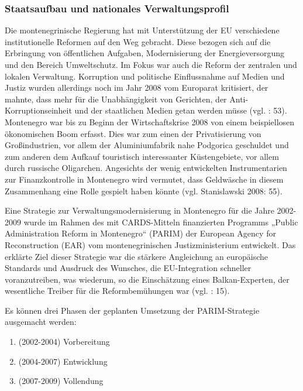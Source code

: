 \subsubsection{Staatsaufbau und nationales Verwaltungsprofil}

Die montenegrinische Regierung hat mit Unterstützung der EU verschiedene institutionelle Reformen auf den Weg gebracht. Diese bezogen sich auf die Erbringung von öffentlichen Aufgaben, Modernisierung der Energieversorgung und den Bereich Umweltschutz. Im Fokus war auch die Reform der zentralen und lokalen Verwaltung. Korruption und politische Einflussnahme auf Medien und Justiz wurden allerdings noch im Jahr 2008 vom Europarat kritisiert, der mahnte, dass mehr für die Unabhängigkeit von Gerichten, der Anti-Korruptionseinheit und der staatlichen Medien getan werden müsse (vgl. \cite{stanislaw} : 53). Montenegro war bis zu Beginn der Wirtschaftskrise 2008 von einem beispiellosen ökonomischen Boom erfasst. Dies war zum einen der Privatisierung von Großindustrien, vor allem der Aluminiumfabrik nahe Podgorica geschuldet und zum anderen dem Aufkauf touristisch interessanter Küstengebiete, vor allem durch russische Oligarchen. Angesichts der wenig entwickelten Instrumentarien zur Finanzkontrolle in Montenegro wird vermutet, dass Geldwäsche in diesem Zusammenhang eine Rolle gespielt haben könnte (vgl. Stanislawski 2008: 55).\par
Eine Strategie zur Verwaltungsmodernisierung in Montenegro für die Jahre 2002-2009 wurde im Rahmen des mit CARDS-Mitteln finanzierten Programms „Public Administration Reform in Montenegro“ (PARIM) der European Agency for Reconstruction (EAR) vom montenegrinischen Justizministerium entwickelt. Das erklärte Ziel dieser Strategie war die stärkere Angleichung an europäische Standards und Ausdruck des Wunsches, die EU-Integration schneller voranzutreiben, was wiederum, so die Einschätzung eines Balkan-Experten, der wesentliche Treiber für die Reformbemühungen war (vgl. \cite{dzamuk} : 15).\par

Es können drei Phasen der geplanten Umsetzung der PARIM-Strategie ausgemacht werden:
\begin{enumerate}[label=Phase {\Roman*}:,align=left,  leftmargin=*] \itemsep1pt \parskip0pt 
\item (2002-2004) Vorbereitung
\item (2004-2007) Entwicklung
\item  (2007-2009) Vollendung
\end{enumerate}

